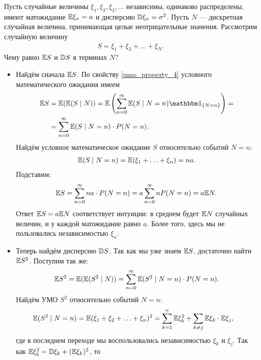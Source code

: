 \documentclass[../main.tex]{subfiles}
\begin{document}
\begin{exmpl}
 Пусть случайные величины $ \xi_1, \xi_2, \xi_3, \ldots $ независимы, одинаково распределены, имеют матожидание $ \mathbb E\xi_n = a $ и дисперсию $ \mathbb D\xi_n = \sigma^{2} $. Пусть $ N $ --- дискретная случайная величина, принимающая целые неотрицательные значения. Рассмотрим случайную величину
 \begin{align*}
  S = \xi_1  + \xi_2 + \ldots + \xi_N.
 \end{align*} Чему равно $ \mathbb E S $ и $ \mathbb D S $ в терминах $ N $?

 \begin{itemize}
  \item Найдём сначала $ \mathbb E S $. По свойству \ref{umo_property_4} условного математического ожидания имеем
   \begin{align*}
    \E S &= \E(\E(S \mid N)) = \E \left( \sum_{n=0}^{\infty} \E(S \mid N = n) \Ind_{\left\{ N = n \right\}} \right) = \\
    &= \sum_{n=0}^{\infty} \E(S \mid N = n) \cdot P(N = n).
   \end{align*} Найдём условное математическое ожидание $ S $ относительно событий $ N = n $:
   \begin{align*}
    \mathbb E(S \mid N = n) = \mathbb E(\xi_1 + \ldots + \xi_n) = na.
   \end{align*} Подставим:
   \begin{align*}
    \mathbb E S = \sum_{n=0}^{\infty}na \cdot P(N = n) = a \sum_{n=0}^{\infty} n P(N = n) = a \mathbb E N.
   \end{align*} Ответ $ \mathbb E S = a \mathbb E N$ соответствует интуиции: в среднем будет $ \mathbb E N $ случайных величин, и у каждой матожидание равно $ a $. Более того, здесь мы не пользовались независимостью $ \xi_n $.
  \item Теперь найдём дисперсию $ \mathbb D S $. Так как мы уже знаем $ \mathbb E S $, достаточно найти $ \mathbb E S^{2} $. Поступим так же:
   \begin{align*}
    \mathbb E S^{2} = \mathbb E(\mathbb E(S^{2}\mid N)) = \sum_{n=0}^{\infty} \mathbb E(S^{2} \mid N = n) \cdot P(N = n).
   \end{align*} Найдём УМО $ S^{2} $ относительно событий $ N = n $:
   \begin{align*}
    \mathbb E(S^{2} \mid N = n) &= \mathbb E(\xi_1 + \xi_2 + \ldots + \xi_n)^{2} = \sum_{k=1}^{n} \mathbb E \xi_k^{2} + \sum_{k \neq j} \mathbb E\xi_k \cdot \mathbb E\xi_j,
   \end{align*} где в последнем переходе мы воспользовались независимостью $ \xi_k $ и $ \xi_j $. Так как $ \mathbb E\xi_k^{2} = \mathbb D\xi_k + (\mathbb E\xi_k)^{2} $, то
   \begin{align*}

\end{align*}
\end{itemize}
\end{exmpl}
\end{document}
